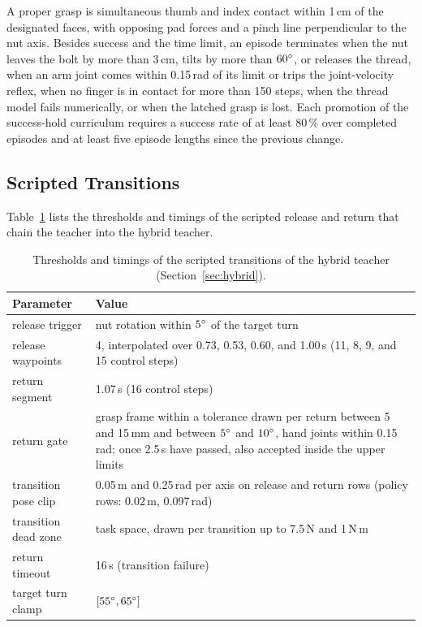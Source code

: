 A proper grasp is simultaneous thumb and index contact within 1\,cm of the designated faces, with opposing pad forces and a pinch line perpendicular to the nut axis. Besides success and the time limit, an episode terminates when the nut leaves the bolt by more than 3\,cm, tilts by more than $60^\circ$, or releases the thread, when an arm joint comes within 0.15\,rad of its limit or trips the joint-velocity reflex, when no finger is in contact for more than 150 steps, when the thread model fails numerically, or when the latched grasp is lost. Each promotion of the success-hold curriculum requires a success rate of at least 80\,\% over completed episodes and at least five episode lengths since the previous change.

\subsection{Scripted Transitions}\label{sec:app-hybrid}

Table~\ref{tab:hybrid-params} lists the thresholds and timings of the scripted release and return that chain the teacher into the hybrid teacher.

\begin{table}[!htbp]%
    \centering%
    \caption{Thresholds and timings of the scripted transitions of the hybrid teacher (Section~\ref{sec:hybrid}).}%
    \label{tab:hybrid-params}%
    \small
    \begin{tabular}{lp{}}
        \toprule
        Parameter & Value \\
        \midrule
        release trigger & nut rotation within $5^\circ$ of the target turn \\
        release waypoints & 4, interpolated over 0.73, 0.53, 0.60, and 1.00\,s (11, 8, 9, and 15 control steps) \\
        return segment & 1.07\,s (16 control steps) \\
        return gate & grasp frame within a tolerance drawn per return between 5 and 15\,mm and between $5^\circ$ and $10^\circ$, hand joints within 0.15\,rad; once 2.5\,s have passed, also accepted inside the upper limits \\
        transition pose clip & 0.05\,m and 0.25\,rad per axis on release and return rows (policy rows: 0.02\,m, 0.097\,rad) \\
        transition dead zone & task space, drawn per transition up to 7.5\,N and 1\,N\,m \\
        return timeout & 16\,s (transition failure) \\
        target turn clamp & $[55^\circ,65^\circ]$ \\
        \bottomrule
    \end{tabular}
\end{table}%

